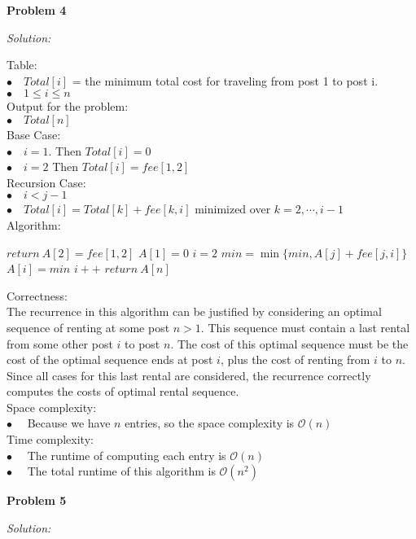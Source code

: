 \documentclass[12pt,letterpaper]{article}
\def\pp{\par\noindent}
\newcommand{\problem}[1]{ \bigskip \pp \textbf{Problem #1}\par}
\newcommand{\solution}{\textit{Solution:}\par}
\begin{document}
\problem{4}
\solution
Table: \\
$\bullet \quad Total[i]$ = the minimum total cost for traveling from post 1 to post i. \\
$\bullet \quad 1 \le i \le n$ \\
Output for the problem: \\
$\bullet \quad Total[n]$ \\
Base Case: \\
$\bullet \quad i = 1 $. Then $Total[i] = 0 $  \\
$\bullet \quad i = 2 $ Then $Total[i] = fee[1,2]$ \\
Recursion Case: \\
$\bullet \quad i < j - 1$ \\
$\bullet \quad Total[i] = Total[k] + fee[k,i]$ minimized over $ k = 2,\cdots,i-1$ \\
Algorithm: \\
\begin{algorithm}[H]
 {
	$return\  A[2] = fee[1,2]$ \;
}
$A[1] = 0$\;
$ i = 2 $\;
{
  {
 $min = \min \{min,A[j] + fee[j,i] \}$\;
 }
$A[i] = min $\;
$ i ++ $\;
}
   $return\  A[n]$ \;
\end{algorithm}
Correctness: \\
The recurrence in this algorithm can be justified by considering an optimal sequence of renting at some post $ n > 1$. This sequence must contain a last rental from some other post $i$ to post $n$. The cost of this optimal sequence must be the cost of the optimal sequence ends at post $i$, plus the cost of renting from $i$ to $n$. Since all cases for this last rental are considered, the recurrence correctly computes the costs of optimal rental sequence. \\
Space complexity: \\
$\bullet \quad$ Because we have $ n $ entries, so the space complexity is $\mathcal{O}(n)$ \\
Time complexity: \\
$\bullet \quad$ The runtime of computing each entry is $\mathcal{O}(n)$ \\
$\bullet \quad$ The total runtime of this algorithm is $\mathcal{O}(n^2)$ \\

\problem{5}
\solution
\end{document}
